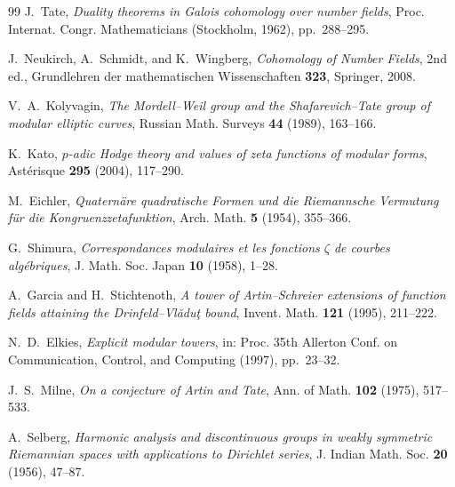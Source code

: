 \documentclass[11pt,reqno]{article}
\theoremstyle{plain}
\theoremstyle{definition}
\begin{document}
\begin{thebibliography}{99}
J.~Tate, \emph{Duality theorems in Galois cohomology over number fields}, Proc. Internat. Congr. Mathematicians (Stockholm, 1962), pp.~288--295.

J.~Neukirch, A.~Schmidt, and K.~Wingberg, \emph{Cohomology of Number Fields}, 2nd ed., Grundlehren der mathematischen Wissenschaften \textbf{323}, Springer, 2008.

V.~A.~Kolyvagin, \emph{The Mordell--Weil group and the Shafarevich--Tate group of modular elliptic curves}, Russian Math. Surveys \textbf{44} (1989), 163--166.

K.~Kato, \emph{$p$-adic Hodge theory and values of zeta functions of modular forms}, Astérisque \textbf{295} (2004), 117--290.

M.~Eichler, \emph{Quaternäre quadratische Formen und die Riemannsche Vermutung für die Kongruenzzetafunktion}, Arch. Math. \textbf{5} (1954), 355--366.

G.~Shimura, \emph{Correspondances modulaires et les fonctions $\zeta$ de courbes algébriques}, J. Math. Soc. Japan \textbf{10} (1958), 1--28.

A.~Garcia and H.~Stichtenoth, \emph{A tower of Artin--Schreier extensions of function fields attaining the Drinfeld--Vl\u{a}du\c{t} bound}, Invent. Math. \textbf{121} (1995), 211--222.

N.~D.~Elkies, \emph{Explicit modular towers}, in: Proc. 35th Allerton Conf. on Communication, Control, and Computing (1997), pp.~23--32.

J.~S.~Milne, \emph{On a conjecture of Artin and Tate}, Ann. of Math. \textbf{102} (1975), 517--533.

A.~Selberg, \emph{Harmonic analysis and discontinuous groups in weakly symmetric Riemannian spaces with applications to Dirichlet series}, J. Indian Math. Soc. \textbf{20} (1956), 47--87.
\end{thebibliography}
\end{document}

